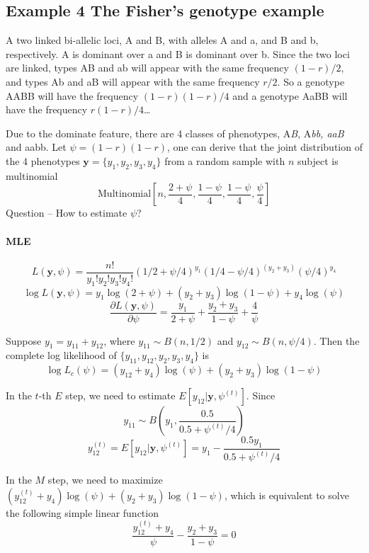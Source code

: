 \documentclass[]{article}
\let\oldparagraph\paragraph
\renewcommand{\paragraph}[1]{\oldparagraph{#1}\mbox{}}
\begin{document}
\hypertarget{example-4-the-fishers-genotype-example}{%
\subsection{Example 4 The Fisher's genotype
example}\label{example-4-the-fishers-genotype-example}}

A two linked bi-allelic loci, A and B, with alleles A and a, and B and
b, respectively. A is dominant over a and B is dominant over b. Since
the two loci are linked, types AB and ab will appear with the same
frequency \((1-r)/2\), and types Ab and aB will appear with the same
frequency \(r/2\). So a genotype AABB will have the frequency
\((1-r)(1-r)/4\) and a genotype AaBB will have the frequency
\(r(1-r)/4\)\ldots{}

Due to the dominate feature, there are 4 classes of phenotypes,
A\emph{B}, A\emph{bb, aaB} and aabb. Let \(\psi = (1-r)(1-r)\), one can
derive that the joint distribution of the 4 phenotypes
\(\mathbf{y} = \{y_1,y_2,y_3,y_4\}\) from a random sample with \(n\)
subject is multinomial
\[\mbox{Multinomial} [ n, \frac{2+\psi}{4}, \frac{1-\psi}{4}, \frac{1-\psi}{4} ,\frac{\psi}{4} ]\]
Question -- How to estimate \(\psi\)?

\newslide
\paragraph{MLE}

\[L(\mathbf{y}, \psi) = \frac{n!}{y_1!y_2!y_3!y_4!} (1/2+\psi/4)^{y_1}(1/4 - \psi/4)^{(y_2+y_3)} (\psi/4)^{y_4}\]
\[\log L(\mathbf{y}, \psi) = y_1\log(2+\psi) + (y_2+y_3) \log(1-\psi) + y_4 \log(\psi)\]
\[\frac{\partial L(\mathbf{y}, \psi)}{\partial \psi} =\frac{y_1}{2+\psi}+\frac{y_2+y_3}{1-\psi} +\frac{4}{\psi} \]

Suppose \(y_1 = y_{11} + y_{12}\), where \(y_{11} \sim B(n, 1/2)\) and
\(y_{12} \sim B(n, \psi/4)\). Then the complete log likelihood of
\(\{y_{11},y_{12},y_2,y_3,y_4\}\) is
\[\log L_c(\psi) = (y_{12} + y_4) \log(\psi) + (y_2+y_3)\log(1-\psi) \]

In the \(t\)-th \(E\) step, we need to estimate
\(E[y_{12}| \mathbf{y},\psi^{(t)} ]\). Since
\[y_{11} \sim B(y_1, \frac{0.5}{0.5+\psi^{(t)}/4})\]
\[y_{12}^{(t)} = E[y_{12}| \mathbf{y},\psi^{(t)} ] = y_1 - \frac{0.5y_1}{0.5+\psi^{(t)}/4}\]

In the \(M\) step, we need to maximize
\((y_{12}^{(t)} + y_4) \log(\psi) + (y_2+y_3)\log(1-\psi)\), which is
equivalent to solve the following simple linear function
\[\frac{y_{12}^{(t)} + y_4}{\psi} - \frac{y_2+y_3}{1-\psi} = 0\]
\end{document}
